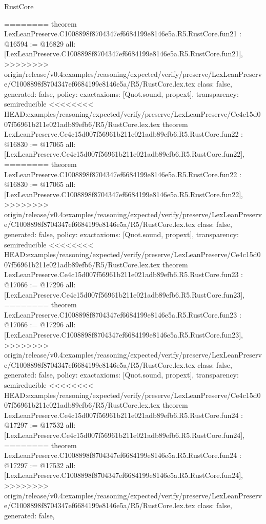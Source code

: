 \begin{lexlean}{RustCore}
\begin{coremodule}
{\begin{coremodule}
{{{{{{{{{{{{{{{{{{{{{{{{========
theorem LexLeanPreserve.C1008898f8704347ef6684199e8146e5a.R5.RustCore.fun21 : @16594 := @16829 {
  all: [LexLeanPreserve.C1008898f8704347ef6684199e8146e5a.R5.RustCore.fun21],
>>>>>>>> origin/release/v0.4:examples/reasoning/expected/verify/preserve/LexLeanPreserve/C1008898f8704347ef6684199e8146e5a/R5/RustCore.lex.tex
  class: false,
  generated: false,
  policy: exact{axioms: [Quot.sound, propext]},
  transparency: semireducible
}
<<<<<<<< HEAD:examples/reasoning/expected/verify/preserve/LexLeanPreserve/Ce4c15d007f56961b211e021adb89efb6/R5/RustCore.lex.tex
theorem LexLeanPreserve.Ce4c15d007f56961b211e021adb89efb6.R5.RustCore.fun22 : @16830 := @17065 {
  all: [LexLeanPreserve.Ce4c15d007f56961b211e021adb89efb6.R5.RustCore.fun22],
========
theorem LexLeanPreserve.C1008898f8704347ef6684199e8146e5a.R5.RustCore.fun22 : @16830 := @17065 {
  all: [LexLeanPreserve.C1008898f8704347ef6684199e8146e5a.R5.RustCore.fun22],
>>>>>>>> origin/release/v0.4:examples/reasoning/expected/verify/preserve/LexLeanPreserve/C1008898f8704347ef6684199e8146e5a/R5/RustCore.lex.tex
  class: false,
  generated: false,
  policy: exact{axioms: [Quot.sound, propext]},
  transparency: semireducible
}
<<<<<<<< HEAD:examples/reasoning/expected/verify/preserve/LexLeanPreserve/Ce4c15d007f56961b211e021adb89efb6/R5/RustCore.lex.tex
theorem LexLeanPreserve.Ce4c15d007f56961b211e021adb89efb6.R5.RustCore.fun23 : @17066 := @17296 {
  all: [LexLeanPreserve.Ce4c15d007f56961b211e021adb89efb6.R5.RustCore.fun23],
========
theorem LexLeanPreserve.C1008898f8704347ef6684199e8146e5a.R5.RustCore.fun23 : @17066 := @17296 {
  all: [LexLeanPreserve.C1008898f8704347ef6684199e8146e5a.R5.RustCore.fun23],
>>>>>>>> origin/release/v0.4:examples/reasoning/expected/verify/preserve/LexLeanPreserve/C1008898f8704347ef6684199e8146e5a/R5/RustCore.lex.tex
  class: false,
  generated: false,
  policy: exact{axioms: [Quot.sound, propext]},
  transparency: semireducible
}
<<<<<<<< HEAD:examples/reasoning/expected/verify/preserve/LexLeanPreserve/Ce4c15d007f56961b211e021adb89efb6/R5/RustCore.lex.tex
theorem LexLeanPreserve.Ce4c15d007f56961b211e021adb89efb6.R5.RustCore.fun24 : @17297 := @17532 {
  all: [LexLeanPreserve.Ce4c15d007f56961b211e021adb89efb6.R5.RustCore.fun24],
========
theorem LexLeanPreserve.C1008898f8704347ef6684199e8146e5a.R5.RustCore.fun24 : @17297 := @17532 {
  all: [LexLeanPreserve.C1008898f8704347ef6684199e8146e5a.R5.RustCore.fun24],
>>>>>>>> origin/release/v0.4:examples/reasoning/expected/verify/preserve/LexLeanPreserve/C1008898f8704347ef6684199e8146e5a/R5/RustCore.lex.tex
  class: false,
  generated: false,
}}}}}}}}}}}}}}}}}}}}}}}}}}}}
\end{coremodule}}
\end{coremodule}
\end{lexlean}
